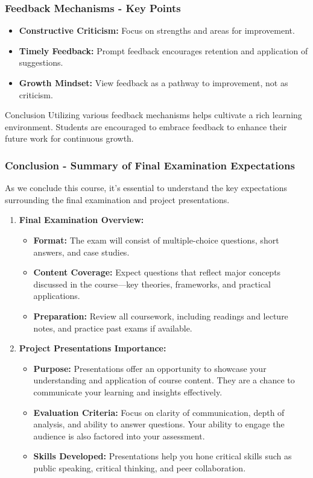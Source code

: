 \documentclass[aspectratio=169]{beamer}
\begin{document}
\begin{frame}[fragile]
  \frametitle{Feedback Mechanisms - Key Points}
  \begin{itemize}
    \item \textbf{Constructive Criticism:} Focus on strengths and areas for improvement.
    \item \textbf{Timely Feedback:} Prompt feedback encourages retention and application of suggestions.
    \item \textbf{Growth Mindset:} View feedback as a pathway to improvement, not as criticism.
  \end{itemize}
  \begin{block}{Conclusion}
    Utilizing various feedback mechanisms helps cultivate a rich learning environment. 
    Students are encouraged to embrace feedback to enhance their future work for continuous growth.
  \end{block}
\end{frame}

\begin{frame}[fragile]
    \frametitle{Conclusion - Summary of Final Examination Expectations}
    As we conclude this course, it's essential to understand the key expectations surrounding the final examination and project presentations. 
    
    \begin{enumerate}
        \item \textbf{Final Examination Overview:}
        \begin{itemize}
            \item \textbf{Format:} The exam will consist of multiple-choice questions, short answers, and case studies. 
            \item \textbf{Content Coverage:} Expect questions that reflect major concepts discussed in the course—key theories, frameworks, and practical applications.
            \item \textbf{Preparation:} Review all coursework, including readings and lecture notes, and practice past exams if available.
        \end{itemize}
        
        \item \textbf{Project Presentations Importance:}
        \begin{itemize}
            \item \textbf{Purpose:} Presentations offer an opportunity to showcase your understanding and application of course content. They are a chance to communicate your learning and insights effectively.
            \item \textbf{Evaluation Criteria:} Focus on clarity of communication, depth of analysis, and ability to answer questions. Your ability to engage the audience is also factored into your assessment.
            \item \textbf{Skills Developed:} Presentations help you hone critical skills such as public speaking, critical thinking, and peer collaboration.
        \end{itemize}
    \end{enumerate}
\end{frame}
\end{document}
